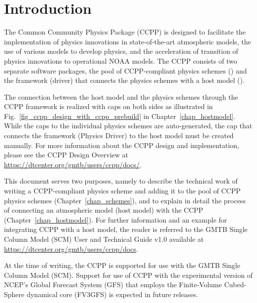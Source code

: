 \chapter{Introduction}\label{chap_introduction}
\setlength{\parskip}{12pt}

The Common Community Physics Package (CCPP) is designed to facilitate the implementation of physics innovations in state-of-the-art atmospheric models, the use of various models to develop physics, and the acceleration of transition of physics innovations to operational NOAA models. The CCPP consists of two separate software packages, the pool of CCPP-compliant physics schemes () and the framework (driver) that connects the physics schemes with a host model ().

The connection between the host model and the physics schemes through the CCPP framework is realized with caps on both sides as illustrated in Fig.~\ref{fig_ccpp_design_with_ccpp_prebuild} in Chapter~\ref{chap_hostmodel}. While the caps to the individual physics schemes are auto-generated, the cap that connects the framework (Physics Driver) to the host model must be created manually. For more information about the CCPP design and implementation, please see the CCPP Design Overview at {\url{https://dtcenter.org/gmtb/users/ccpp/docs/}}.

This document serves two purposes, namely to describe the technical work of writing a CCPP-compliant physics scheme and adding it to the pool of CCPP physics schemes (Chapter~\ref{chap_schemes}), and to explain in detail the process of connecting an atmospheric model (host model) with the CCPP (Chapter~\ref{chap_hostmodel}). For further information and an example for integrating CCPP with a host model, the reader is referred to the GMTB Single Column Model (SCM) User and Technical Guide v1.0 available at {\url{https://dtcenter.org/gmtb/users/ccpp/docs}}.

At the time of writing, the CCPP is supported for use with the GMTB Single Column Model (SCM). Support for use of CCPP with the experimental version of NCEP's Global Forecast System (GFS) that employs the Finite-Volume Cubed-Sphere dynamical core (FV3GFS) is expected in future releases. 

